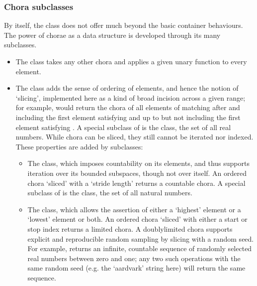 \documentclass[letterpaper,10pt,english]{jupyterBook}
\begin{document}
\subsubsection{Chora subclasses}
\label{\detokenize{content/chapter_03_everest/implementation:chora-subclasses}}
\sphinxAtStartPar
By itself, the  class does not offer much beyond the basic  container behaviours. The power of chorae as a data structure is developed through its many subclasses.
\begin{itemize}
\item {} 
\sphinxAtStartPar
The  class takes any other chora and applies a given unary function to every element.

\item {} 
\sphinxAtStartPar
The  class adds the sense of ordering of elements, and hence the notion of  ‘slicing’, implemented here as a kind of broad incision across a given range; for example,  would return the chora of all elements of  matching  after and including the first element satisfying  and up to but not including the first element satisfying . A special subclass of  is the  class, the set of all real numbers. While  chora can be sliced, they still cannot be iterated nor indexed. These properties are added by subclasses:
\begin{itemize}
\item {} 
\sphinxAtStartPar
The  class, which imposes countability on its elements, and thus supports iteration over its bounded subspaces, though not over itself. An ordered chora ‘sliced’ with a ‘stride length’ returns a countable chora. A special subclass of  is the  class, the set of all natural numbers.

\item {} 
\sphinxAtStartPar
The  class, which allows the assertion of either a ‘highest’ element or a ‘lowest’ element or both. An ordered chora ‘sliced’ with either a start or stop index returns a limited chora. A doubly\sphinxhyphen{}limited chora supports explicit and reproducible random sampling by slicing with a random seed. For example,  returns an infinite, countable sequence of randomly selected real numbers between zero and one; any two such operations with the same random seed (e.g. the ‘aardvark’ string here) will return the same sequence.


\end{itemize}
\end{itemize}
\end{document}
